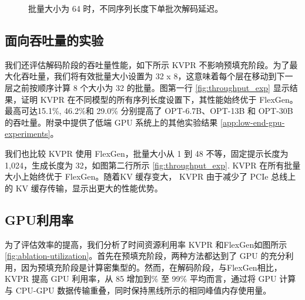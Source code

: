 \documentclass[11pt]{article}
\newcommand{\paperName}{KVPR}
\begin{document}
\begin{figure}[h]
    \caption{批量大小为 64 时，不同序列长度下单批次解码延迟。}
    \label{fig:latency-exp}
\end{figure}


\subsection{面向吞吐量的实验}



我们还评估解码阶段的吞吐量性能，如下所示 {\paperName} 不影响预填充阶段。为了最大化吞吐量，我们将有效批量大小设置为 32 x 8，这意味着每个层在移动到下一层之前按顺序计算 8 个大小为 32 的批量。图第一行 \ref{fig:throughput_exp} 显示结果，证明 {\paperName} 在不同模型的所有序列长度设置下，其性能始终优于 FlexGen。最高可达15.1\%, 46.2\%和 29.0\% 分别提高了 OPT-6.7B、OPT-13B 和 OPT-30B 的吞吐量。附录中提供了低端 GPU 系统上的其他实验结果 \ref{app:low-end-gpu-experiments}。

我们也比较 {\paperName} 使用 FlexGen，批量大小从 1 到 48 不等，固定提示长度为 1,024，生成长度为 32，如图第二行所示 \ref{fig:throughput_exp}. {\paperName} 在所有批量大小上始终优于 FlexGen。随着KV 缓存变大， {\paperName} 由于减少了 PCIe 总线上的 KV 缓存传输，显示出更大的性能优势。



\subsection{GPU利用率}

\noindent 为了评估效率的提高，我们分析了时间资源利用率 {\paperName} 和FlexGen如图所示 \ref{fig:ablation-utilization}。首先在预填充阶段，两种方法都达到了 GPU 的充分利用，因为预填充阶段是计算密集型的。然而，在解码阶段，与FlexGen相比， {\paperName} 提高 GPU 利用率，从 85 增加到\% 至 99\% 平均而言，通过将 GPU 计算与 CPU-GPU 数据传输重叠，同时保持黑线所示的相同峰值内存使用量。
\end{document}
